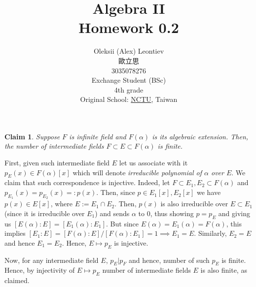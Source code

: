 \documentclass[8pt]{article} %
\title{Algebra II\\Homework 0.2}
\author{Oleksii (Alex) Leontiev\\歐立思\\3035078276\\Exchange Student (BSc)\\4th grade\\
Original School: \href{http://www.nctu.edu.tw/}{NCTU}, Taiwan}
\newtheorem{claim}{Claim}
\newenvironment{proof}[1][Proof]{\begin{trivlist}
\item[\hskip \labelsep {\bfseries #1}]}{\qed\end{trivlist}}
\newcommand{\qed}{\nobreak \ifvmode \relax \else
\ifdim\lastskip<1.5em \hskip-\lastskip
\hskip1.5em plus0em minus0.5em \fi \nobreak
  \vrule height0.75em width0.5em depth0.25em\fi}
\begin{document}
\begin{CJK}{UTF8}{bsmi}
\maketitle
\end{CJK}
\begin{claim}
	Suppose $F$ is infinite field and $F(\alpha)$ is its algebraic extension. Then, the number of intermediate fields
	$F\subset E\subset F(\alpha)$ is finite.
\end{claim}
\begin{proof}
	First, given such intermediate field $E$ let us associate with it $p_E(x)\in F(\alpha)[x]$ which will denote \textit{irreducible
	polynomial of $\alpha$ over $E$}. We claim that such correspondence is injective. Indeed, let $F\subset E_1,E_2\subset F(\alpha)$
	and $p_{E_1}(x)=p_{E_2}(x)=:p(x)$. Then, since $p\in E_1[x],E_2[x]$ we have $p(x)\in E[x]$, where $E:=E_1\cap E_2$. Then,
	$p(x)$ is also irreducible over $E\subset E_1$ (since it is irreducible over $E_1$) and sends $\alpha$ to 0, thus showing
	$p=p_E$ and giving us $[E(\alpha):E]=
	[E_1(\alpha):E_1]$. But since $E(\alpha)=E_1(\alpha)=F(\alpha)$,
	this implies $[E_1:E]=[F(\alpha):E]/[F(\alpha):E_1]=
	1\implies E_1=E$. Similarly, $E_2=E$ and hence $E_1=E_2$. Hence, $E\mapsto p_E$ is injective.

	Now, for any intermediate field $E$, $p_E|p_F$ and hence, number of such $p_E$ is finite. Hence, by injectivity of $E\mapsto p_E$
	number of intermediate fields $E$ is also finite, as claimed.
\end{proof}
\end{document}
